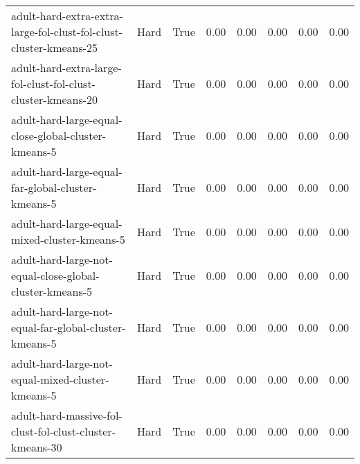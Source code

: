\begin{longtable}{llllllll}
\bottomrule
\endlastfoot
                                           adult-hard-extra-extra-large-fol-clust-fol-clust-cluster-kmeans-25 &         Hard &        True &                 0.00 &                 0.00 &                         0.00 &                         0.00 &                         0.00 \\
                                                 adult-hard-extra-large-fol-clust-fol-clust-cluster-kmeans-20 &         Hard &        True &                 0.00 &                 0.00 &                         0.00 &                         0.00 &                         0.00 \\
                                                         adult-hard-large-equal-close-global-cluster-kmeans-5 &         Hard &        True &                 0.00 &                 0.00 &                         0.00 &                         0.00 &                         0.00 \\
                                                           adult-hard-large-equal-far-global-cluster-kmeans-5 &         Hard &        True &                 0.00 &                 0.00 &                         0.00 &                         0.00 &                         0.00 \\
                                                                adult-hard-large-equal-mixed-cluster-kmeans-5 &         Hard &        True &                 0.00 &                 0.00 &                         0.00 &                         0.00 &                         0.00 \\
                                                     adult-hard-large-not-equal-close-global-cluster-kmeans-5 &         Hard &        True &                 0.00 &                 0.00 &                         0.00 &                         0.00 &                         0.00 \\
                                                       adult-hard-large-not-equal-far-global-cluster-kmeans-5 &         Hard &        True &                 0.00 &                 0.00 &                         0.00 &                         0.00 &                         0.00 \\
                                                            adult-hard-large-not-equal-mixed-cluster-kmeans-5 &         Hard &        True &                 0.00 &                 0.00 &                         0.00 &                         0.00 &                         0.00 \\
                                                     adult-hard-massive-fol-clust-fol-clust-cluster-kmeans-30 &         Hard &        True &                 0.00 &                 0.00 &                         0.00 &                         0.00 &                         0.00 \\

\end{longtable}
